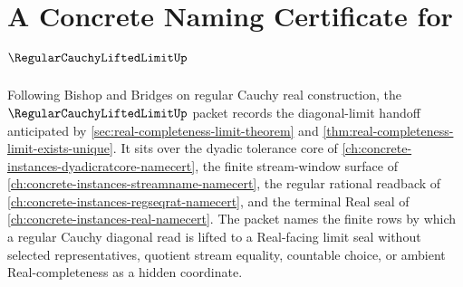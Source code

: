 \chapter{A Concrete Naming Certificate for $\RegularCauchyLiftedLimitUp$}
\label{ch:concrete-instances-regular-cauchy-lifted-limit-namecert}

Following Bishop and Bridges on regular Cauchy real construction, the $\RegularCauchyLiftedLimitUp$ packet records the diagonal-limit handoff anticipated by \autoref{sec:real-completeness-limit-theorem} and \autoref{thm:real-completeness-limit-exists-unique}. It sits over the dyadic tolerance core of \autoref{ch:concrete-instances-dyadicratcore-namecert}, the finite stream-window surface of \autoref{ch:concrete-instances-streamname-namecert}, the regular rational readback of \autoref{ch:concrete-instances-regseqrat-namecert}, and the terminal Real seal of \autoref{ch:concrete-instances-real-namecert}. The packet names the finite rows by which a regular Cauchy diagonal read is lifted to a Real-facing limit seal without selected representatives, quotient stream equality, countable choice, or ambient Real-completeness as a hidden coordinate.

